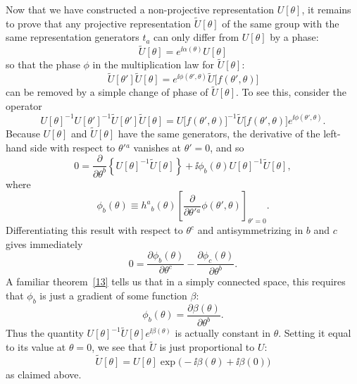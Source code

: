 Now that we have constructed a non-projective representation $U[\theta]$,
it remains to prove that any projective representation
$\widetilde U[\theta]$ of the same group with the same representation
generators $t_a$ can only differ from $U[\theta]$ by a phase:
\begin{equation*}
  \widetilde U[\theta]=e^{\ii\alpha(\theta)}U[\theta]
\end{equation*}
so that the phase $\phi$ in the multiplication law for
$\widetilde U[\theta]$:
\begin{equation*}
  \widetilde U[\theta']\widetilde U[\theta]
    =e^{\ii\phi(\theta',\theta)}
      \widetilde U\bigl[f(\theta',\theta)\bigr]
\end{equation*}
can be removed by a simple change of phase of $\widetilde U[\theta]$. To
see this, consider the operator
\begin{equation*}
  U[\theta]^{-1}U[\theta']^{-1}
    \widetilde U[\theta']\widetilde U[\theta]
  =U\bigl[f(\theta',\theta)\bigr]^{-1}
    \widetilde U\bigl[f(\theta',\theta)\bigr]
    e^{\ii\phi(\theta',\theta)}.
\end{equation*}
Because $U[\theta]$ and $\widetilde U[\theta]$ have the same generators,
the derivative of the left-hand side with respect to $\theta'{}^a$ vanishes
at $\theta'=0$, and so
\begin{equation*}
  0=\frac{\partial}{\partial\theta^b}
    \left\{U[\theta]^{-1}\widetilde U[\theta]\right\}
    +\ii\phi_b(\theta)U[\theta]^{-1}\widetilde U[\theta],
\end{equation*}
where
\begin{equation*}
  \phi_b(\theta)\equiv h^a{}_{b}(\theta)
    \left[
      \frac{\partial}{\partial\theta'{}^a}\phi(\theta',\theta)
    \right]_{\theta'=0}.
\end{equation*}
Differentiating this result with respect to $\theta^c$ and
antisymmetrizing in $b$ and $c$ gives immediately
\begin{equation*}
  0=\frac{\partial\phi_b(\theta)}{\partial\theta^c}
    -\frac{\partial\phi_c(\theta)}{\partial\theta^b}.
\end{equation*}
A familiar theorem~\hyperref[ref:2.13]{[13]} tells us that in a simply connected
space, this requires that $\phi_b$ is just a gradient of some function
$\beta$:
\begin{equation*}
  \phi_b(\theta)=\frac{\partial\beta(\theta)}{\partial\theta^b}.
\end{equation*}
Thus the quantity
$U[\theta]^{-1}\widetilde U[\theta]e^{\ii\beta(\theta)}$ is actually constant
in $\theta$. Setting it equal to its value at $\theta=0$, we see that
$\widetilde U$ is just proportional to $U$:
\begin{equation*}
  \widetilde U[\theta]
    =U[\theta]\exp\bigl(-\ii\beta(\theta)+\ii\beta(0)\bigr)
\end{equation*}
as claimed above.

